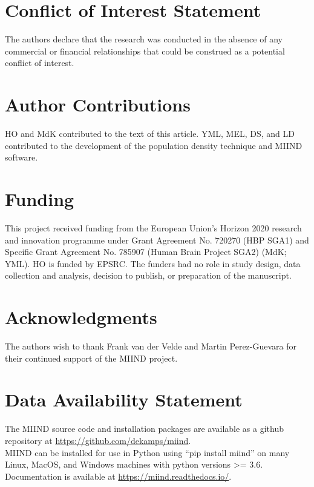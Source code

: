 \documentclass[utf8]{frontiersSCNS} %
\begin{document}
\section*{Conflict of Interest Statement}

The authors declare that the research was conducted in the absence of any commercial or financial relationships that could be construed as a potential conflict of interest.

\section*{Author Contributions}

HO and MdK contributed to the text of this article. YML, MEL, DS, and LD contributed to the development of the population density technique and MIIND software.\\  

\section*{Funding}
This project received funding from the European Union’s Horizon 2020 research and innovation programme under Grant Agreement No. 720270 (HBP SGA1) and Specific Grant Agreement No. 785907 (Human Brain Project SGA2) (MdK; YML). HO is funded by EPSRC. The funders had no role in study design, data collection and analysis, decision to publish, or preparation of the manuscript.

\section*{Acknowledgments}
The authors wish to thank Frank van der Velde and Martin Perez-Guevara for their continued support of the MIIND project.

\section*{Data Availability Statement}
The MIIND source code and installation packages are available as a github repository at \url{https://github.com/dekamps/miind}.\\
MIIND can be installed for use in Python using ``pip install miind'' on many Linux, MacOS, and Windows machines with python versions \textgreater= 3.6.\\
Documentation is available at \url{https://miind.readthedocs.io/}.
\end{document}

